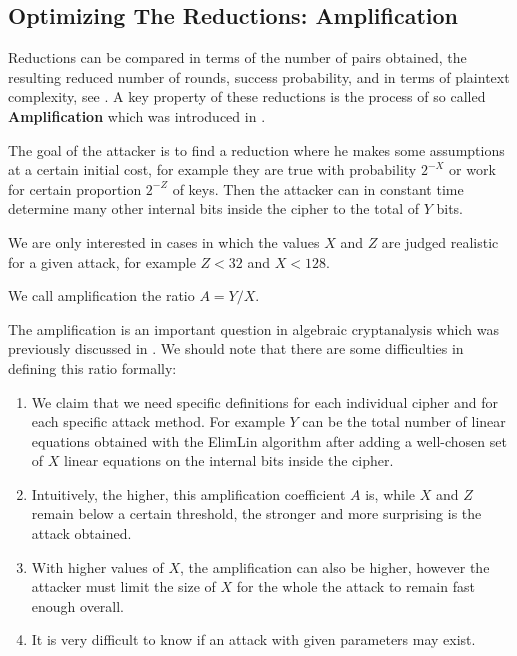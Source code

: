 \subsection{Optimizing The Reductions: Amplification}


Reductions can be compared in terms of the number of pairs obtained, the resulting reduced number of rounds, success probability, and in terms of plaintext complexity, see \cite{gostac,gostreport}.
A key property
of these reductions
is the process of so called {\bf Amplification}
which was introduced in \cite{AlgSnowCourtoisDebraize}.

\begin{mydef}
	The goal of the attacker
	is to find a reduction where he makes some assumptions
	at a certain initial cost,
	for example they are true with probability $2^{-X}$
	or work for certain proportion $2^{-Z}$ of keys.
	Then the attacker can in constant time determine
	many other internal bits inside the cipher to the total of $Y$ bits.
	
	We are only interested in cases in which the values
	$X$ and $Z$ are judged realistic for a given attack,
	for example $Z<32$ and $X<128$.
	
	We call amplification the ratio $A=Y/X$.
\end{mydef}

The amplification is an important question in algebraic cryptanalysis
which was previously discussed in
\cite{AlgSnowCourtoisDebraize}.
We should note that there are some difficulties in defining this ratio formally:

\begin{enumerate}
	\item
	We claim that we need specific definitions for each individual cipher and
	for each specific attack method.
	For example $Y$ can be the total number of linear equations obtained with the ElimLin
	algorithm \cite{AlgSnowCourtoisDebraize,DEScourtois,ElimLinR}
	after adding a well-chosen set of
	$X$ linear equations on the internal bits inside the cipher.
	
	\item
	Intuitively,
	the higher, this amplification coefficient $A$ is,
	while $X$ and $Z$ remain below a certain threshold,
	the stronger and more surprising is the attack obtained.
	
	\item
	With higher  values of $X$, the amplification can also be higher,
	however the attacker must limit the size of $X$
	for the whole the attack to remain fast enough overall.
	
	\item
	It is very difficult to know if an attack with given parameters may exist.
\end{enumerate}



